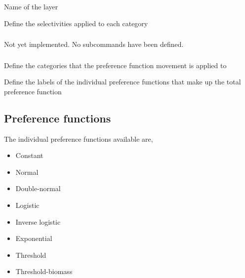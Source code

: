  {Name of the layer}

 {Define the selectivities applied to each category}

\subsubsection[Adjacent cell movement]{}

Not yet implemented. No subcommands have been defined.

\subsubsection[Preference movement]{}

 {Define the categories that the preference function movement is applied to}

 {Define the labels of the individual  preference functions that make up the total preference function}

\subsection{Preference functions}

The individual preference functions available are, 

\begin{itemize}
	\item Constant
	\item Normal
	\item Double-normal
	\item Logistic
	\item Inverse logistic
	\item Exponential
	\item Threshold
	\item Threshold-biomass	
\end{itemize}

